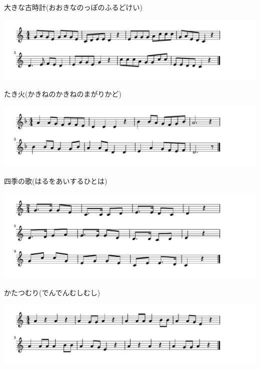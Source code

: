 \documentclass[a4paper]{ltjsarticle}
\begin{document}
\vspace{-10mm} \hspace{10mm}
大きな古時計(おおきなのっぽのふるどけい)

\includegraphics[clip]{takibi_crop.pdf}

\vspace{-10mm} \hspace{10mm}
たき火(かきねのかきねのまがりかど)

\includegraphics[clip]{shikinouta_crop.pdf}

\vspace{-10mm} \hspace{10mm}
四季の歌(はるをあいするひとは)

\includegraphics[clip]{katatsumuri_crop.pdf}

\vspace{-10mm} \hspace{10mm}
かたつむり(でんでんむしむし)

\includegraphics[clip]{hotarukoi_crop.pdf}
\end{document}
